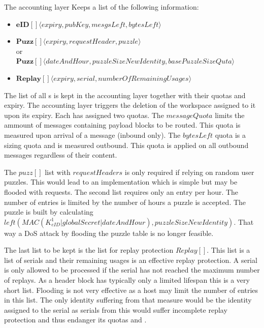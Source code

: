 The accounting layer Keeps a list of the following information:
\begin{itemize}
	\item $\mathbf{eID[]}\langle expiry, pubKey, mesgsLeft, bytesLeft \rangle$\\
	\item $\mathbf{Puzz[]}\langle expiry, requestHeader, puzzle \rangle$\\
	      or\\
	      $\mathbf{Puzz[]}\langle dateAndHour, puzzleSizeNewIdentity, basePuzzleSizeQuta \rangle$\\
	\item $\mathbf{Replay[]}\langle expiry, serial, numberOfRemainingUsages \rangle$\\
\end{itemize}

The list of all s is kept in the accounting layer together with their quotas and expiry. The accounting layer triggers the deletion of the workspace assigned to it upon its expiry. Each  has assigned two quotas. The $messageQuota$ limits the ammount of messages containing payload blocks to be routed. This quota is measured upon arrival of a message (inbound only). The $bytesLeft$ quota is a sizing quota and is measured outbound. This quota is applied on all outbound messages regardless of their content.

The $puzz[]$ list with $requestHeaders$ is only required if relying on random user puzzles. This would lead to an implementation which is simple but may be flooded with  requests. The second list requires only an entry per hour. The number of entries is limited by the number of hours a puzzle is accepted. The puzzle is built by calculating  $left(MAC(K^1_{eID} | globalSecret | dateAndHour ), puzzleSizeNewIdentity)$. That way a DoS attack by flooding the puzzle table is no longer feasible.

The last list to be kept is the list for replay protection $Replay[]$. This list is a list of serials and their remaining usages is an effective replay protection. A serial is only allowed to be processed if the serial has not reached the maximum number of replays. As a header block has typically only a limited lifespan this is a very short list. Flooding is not very effective as a host may limit the number of entries in this list. The only identity suffering from that measure would be the identity assigned to the serial as serials from this  would suffer incomplete replay protection and thus endanger its quotas and .

